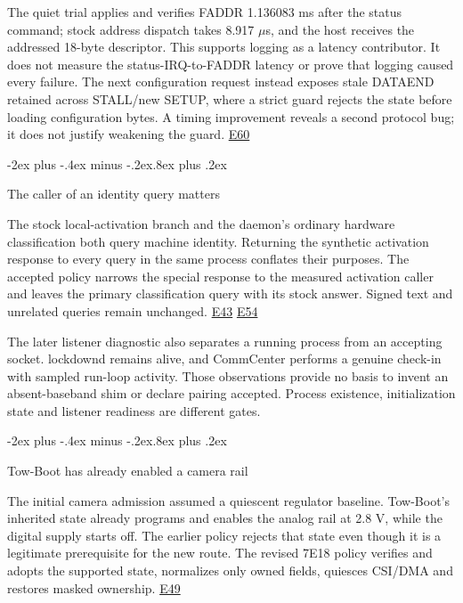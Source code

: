 \documentclass[10pt,letterpaper,twocolumn]{article}
\makeatletter
\renewcommand{\subsection}{\@startsection{subsection}{2}{0pt}
  {-2ex plus -.4ex minus -.2ex}{.8ex plus .2ex}
  {\normalfont\normalsize\bfseries\raggedright}}
\makeatother
\begin{document}
The quiet trial applies and verifies FADDR 1.136083 ms after the status command; stock address dispatch takes 8.917 \(\mu\)s, and the host receives the addressed 18-byte descriptor. This supports logging as a latency contributor. It does not measure the status-IRQ-to-FADDR latency or prove that logging caused every failure. The next configuration request instead exposes stale DATAEND retained across STALL/new SETUP, where a strict guard rejects the state before loading configuration bytes. A timing improvement reveals a second protocol bug; it does not justify weakening the guard. \hyperlink{e-E60}{\textsf{E60}}

\subsection{The caller of an identity query matters}

The stock local-activation branch and the daemon's ordinary hardware classification both query machine identity. Returning the synthetic activation response to every query in the same process conflates their purposes. The accepted policy narrows the special response to the measured activation caller and leaves the primary classification query with its stock answer. Signed text and unrelated queries remain unchanged. \hyperlink{e-E43}{\textsf{E43}} \hyperlink{e-E54}{\textsf{E54}}

The later listener diagnostic also separates a running process from an accepting socket. lockdownd remains alive, and CommCenter performs a genuine check-in with sampled run-loop activity. Those observations provide no basis to invent an absent-baseband shim or declare pairing accepted. Process existence, initialization state and listener readiness are different gates.

\subsection{Tow-Boot has already enabled a camera rail}

The initial camera admission assumed a quiescent regulator baseline. Tow-Boot's inherited state already programs and enables the analog rail at 2.8 V, while the digital supply starts off. The earlier policy rejects that state even though it is a legitimate prerequisite for the new route. The revised 7E18 policy verifies and adopts the supported state, normalizes only owned fields, quiesces CSI/DMA and restores masked ownership. \hyperlink{e-E49}{\textsf{E49}}
\end{document}

